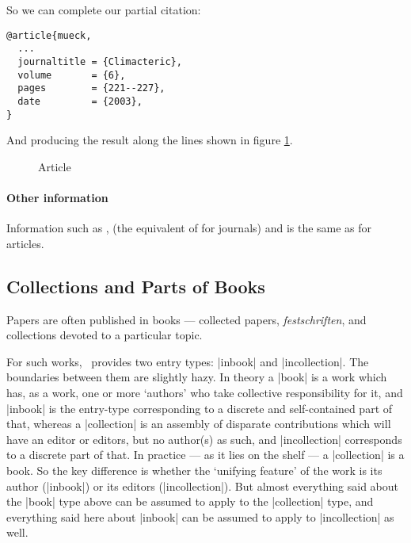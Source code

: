 So we can complete our partial citation:
\begin{Verbatim}
@article{mueck,
  ...
  journaltitle = {Climacteric},
  volume       = {6},
  pages        = {221--227},
  date         = {2003},
}
\end{Verbatim}

And producing the result along the lines shown in figure \ref{mueck2}.

\begin{figure}
  \caption{Article\label{mueck2}}
\end{figure} 

\paragraph{Other information} Information such as ,
 (the equivalent of  for journals) and
 is the same as for articles.

\subsection{Collections and Parts of Books}

Papers are often published in books --- collected papers,
\emph{festschriften}, and collections devoted to a particular topic.

For such works, \biblatex\ provides two entry types: |inbook| and
|incollection|.\label{inbook:vs:incollection} The boundaries between
them are slightly hazy. In theory a |book| is a work which has, as a
work, one or more `authors' who take collective responsibility for it,
and |inbook| is the entry-type corresponding to a discrete and
self-contained part of that, whereas a |collection| is an assembly of
disparate contributions which will have an editor or editors, but no
author(s) as such, and |incollection| corresponds to a discrete part
of that. In practice --- as it lies on the shelf --- a |collection| is
a book. So the key difference is whether the `unifying feature' of the
work is its author (|inbook|) or its editors (|incollection|). But
almost everything said about the |book| type above can be assumed to
apply to the |collection| type, and everything said here about
|inbook| can be assumed to apply to |incollection| as well.

